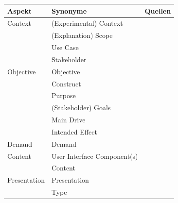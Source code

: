 \begin{table}
    \begin{center}
        \begin{tabular}{|p{}|p{}|p{}|}
            \hline
            \textbf{Aspekt}          & \textbf{Synonyme} & \textbf{Quellen} \\ \hline
            Context         & (Experimental) Context & \cite{chazette_knowledge_nodate} \cite{chazette_end-users_nodate} \cite{sato_context_nodate} \cite{waa_evaluating_2021} \cite{kohl_explainability_2019} \cite{neerincx_using_2018} \cite{sovrano_modelling_2020} \cite{doshi2017towards} \\
                            & (Explanation) Scope & \cite{wohlin2012experimentation} \cite{eiband_impact_2019} \cite{doshi2017towards} \\
                            & Use Case & \cite{waa_evaluating_2021} \\
                            & Stakeholder & \cite{rosenfeld_explainability_2019} \\
            \hline
            Objective       & Objective & \cite{nunes_systematic_2017} \\
                            & Construct & \cite{waa_evaluating_2021} \\
                            & Purpose & \cite{nunes_systematic_2017} \cite{wohlin2012experimentation} \\
                            & (Stakeholder) Goals & \cite{cirqueira_scenario-based_2020} \cite{sovrano_modelling_2020} \cite{ribera2019can} \\
                            & Main Drive & \cite{anjomshoae2019explainable} \\
                            & Intended Effect & \cite{balog_measuring_2020} \\
            \hline
            Demand          & Demand            & \cite{chazette_knowledge_nodate} \\
            \hline
            Content         & User Interface Component(s) & \cite{nunes_systematic_2017} \cite{rosenfeld_explainability_2019} \\
                            & Content           & \cite{ribera2019can} \\
            \hline
            Presentation    & Presentation      & \cite{rosenfeld_explainability_2019} \\
                            & Type              & \cite{ribera2019can} \cite{rosenfeld_explainability_2019} \\

\end{tabular}
\end{center}
\end{table}
